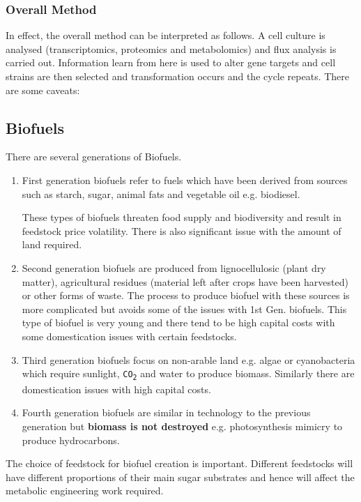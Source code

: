 \documentclass[a4paper]{article}
\newcommand{\ix}[1]{%
  \leavevmode %
  \marginpar{\small\emph{#1}}%
}
\begin{document}
\subsubsection*{Overall Method}
In effect, the overall method can be interpreted as follows. A cell culture is analysed (transcriptomics, proteomics and metabolomics) and flux analysis is carried out. Information learn from here is used to alter gene targets and cell strains are then selected and transformation occurs and the cycle repeats. There are some caveats:

\subsection{Biofuels}
There are several generations of Biofuels.
\begin{enumerate}
\item First generation biofuels\ix{1st Gen.} refer to fuels which have been derived from sources such as starch, sugar, animal fats and vegetable oil e.g. biodiesel.

These types of biofuels threaten food supply and biodiversity\ix{Issues} and result in feedstock price volatility. There is also significant issue with the amount of land required.

\item Second generation biofuels\ix{2nd Gen.} are produced from lignocellulosic (plant dry matter), agricultural residues (material left after crops have been harvested) or other forms of waste. The process to produce biofuel with these sources is more complicated but avoids some of the issues with 1st Gen. biofuels. This type of biofuel is very young and there tend to be high capital costs with some domestication issues with certain feedstocks.

\item Third generation biofuels\ix{3rd Gen.} focus on non-arable land e.g. algae or cyanobacteria which require sunlight, \texttt{CO\textsubscript{2}} and water to produce biomass. Similarly there are domestication issues with high capital costs.

\item Fourth generation biofuels\ix{4th Gen.} are similar in technology to the previous generation but \textbf{biomass is not destroyed} e.g. photosynthesis mimicry to produce hydrocarbons.
\end{enumerate}

The choice of feedstock for biofuel creation is important. Different feedstocks will have different proportions of their main sugar substrates and hence will affect the metabolic engineering work required.
\end{document}
